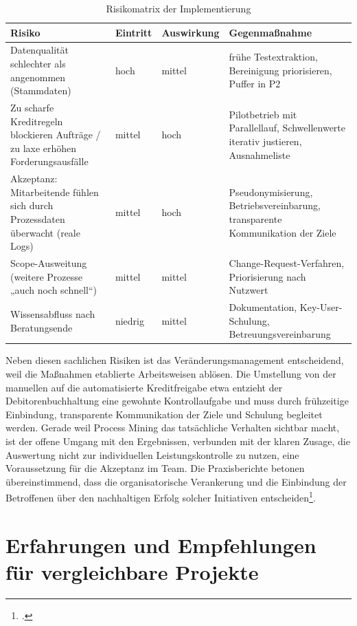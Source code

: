 \begin{table}[!htb]
\centering
\caption{Risikomatrix der Implementierung}\label{tab:risikomatrix}
\small
\begin{tabularx}{\textwidth}{@{}Y l l Y@{}}
\toprule
\textbf{Risiko} & \textbf{Eintritt} & \textbf{Auswirkung} & \textbf{Gegenmaßnahme} \\
\midrule
Datenqualität schlechter als angenommen (Stammdaten) & hoch & mittel & frühe Testextraktion, Bereinigung priorisieren, Puffer in P2 \\
Zu scharfe Kreditregeln blockieren Aufträge /\allowbreak{} zu laxe erhöhen Forderungsausfälle & mittel & hoch & Pilotbetrieb mit Parallellauf, Schwellenwerte iterativ justieren, Ausnahmeliste \\
Akzeptanz: Mitarbeitende fühlen sich durch Prozessdaten überwacht (reale Logs) & mittel & hoch & Pseudonymisierung, Betriebsvereinbarung, transparente Kommunikation der Ziele \\
Scope-Ausweitung (weitere Prozesse „auch noch schnell“) & mittel & mittel & Change-Request-Verfahren, Priorisierung nach Nutzwert \\
Wissensabfluss nach Beratungsende & niedrig & mittel & Dokumentation, Key-User-Schulung, Betreuungsvereinbarung \\
\bottomrule
\end{tabularx}
\end{table}

Neben diesen sachlichen Risiken ist das Veränderungsmanagement entscheidend, weil die Maßnahmen etablierte Arbeitsweisen ablösen. Die Umstellung von der manuellen auf die automatisierte Kreditfreigabe etwa entzieht der Debitorenbuchhaltung eine gewohnte Kontrollaufgabe und muss durch frühzeitige Einbindung, transparente Kommunikation der Ziele und Schulung begleitet werden. Gerade weil Process Mining das tatsächliche Verhalten sichtbar macht, ist der offene Umgang mit den Ergebnissen, verbunden mit der klaren Zusage, die Auswertung nicht zur individuellen Leistungskontrolle zu nutzen, eine Voraussetzung für die Akzeptanz im Team. Die Praxisberichte betonen übereinstimmend, dass die organisatorische Verankerung und die Einbindung der Betroffenen über den nachhaltigen Erfolg solcher Initiativen entscheiden\footcites(Vgl.)()[S.~3 ff.]{reinkemeyer2020processmining}[S.~71 f.]{adolfsson2026o2c}.

\section{Erfahrungen und Empfehlungen für vergleichbare Projekte}\label{sec:erkenntnisse-empfehlungen}

